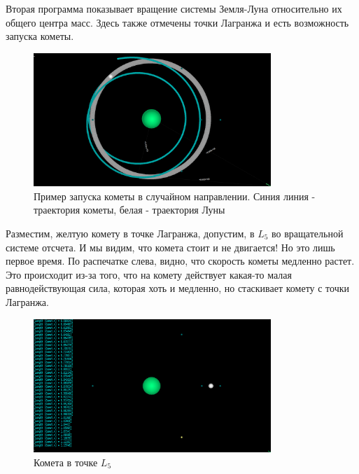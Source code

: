 \documentclass[a4paper,12pt]{article}
\begin{document}
Вторая программа показывает вращение системы Земля-Луна относительно их общего центра масс. Здесь также отмечены точки Лагранжа и есть возможность запуска кометы.
\begin{figure}[H]
    \begin{center}
	\includegraphics[width=0.8\textwidth]{example_2.png}
	\caption{Пример запуска кометы в случайном направлении. Синия линия - траектория кометы, белая - траектория Луны}
    \end{center}
\end{figure}

Разместим, желтую комету в точке Лагранжа, допустим, в $L_5$ во вращательной системе отсчета. И мы видим, что комета стоит и не двигается! Но это лишь первое время. 
По распечатке слева, видно, что скорость кометы медленно растет. Это происходит из-за того, что на комету действует какая-то малая равнодействующая сила,
которая хоть и медленно, но стаскивает комету с точки Лагранжа.
\begin{figure}[H]
    \begin{center}
	\includegraphics[width=0.8\textwidth]{example_3.png}
	\caption{Комета в точке $L_5$}
    \end{center}
\end{figure}
\end{document}
